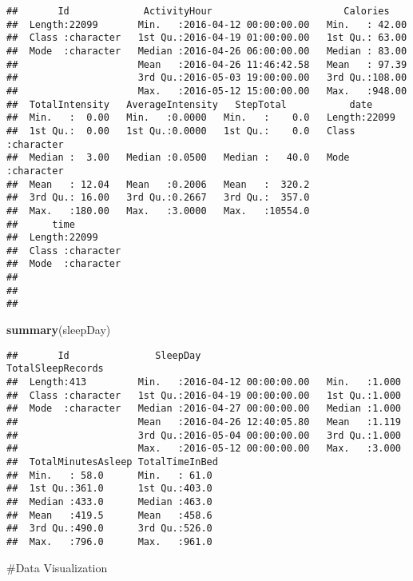 \documentclass[
]{article}
\newenvironment{Shaded}{\begin{snugshade}}{\end{snugshade}}
\newcommand{\FunctionTok}[1]{\textcolor[rgb]{0.13,0.29,0.53}{\textbf{#1}}}
\newcommand{\NormalTok}[1]{#1}
\begin{document}
\begin{verbatim}
##       Id             ActivityHour                       Calories     
##  Length:22099       Min.   :2016-04-12 00:00:00.00   Min.   : 42.00  
##  Class :character   1st Qu.:2016-04-19 01:00:00.00   1st Qu.: 63.00  
##  Mode  :character   Median :2016-04-26 06:00:00.00   Median : 83.00  
##                     Mean   :2016-04-26 11:46:42.58   Mean   : 97.39  
##                     3rd Qu.:2016-05-03 19:00:00.00   3rd Qu.:108.00  
##                     Max.   :2016-05-12 15:00:00.00   Max.   :948.00  
##  TotalIntensity   AverageIntensity   StepTotal           date          
##  Min.   :  0.00   Min.   :0.0000   Min.   :    0.0   Length:22099      
##  1st Qu.:  0.00   1st Qu.:0.0000   1st Qu.:    0.0   Class :character  
##  Median :  3.00   Median :0.0500   Median :   40.0   Mode  :character  
##  Mean   : 12.04   Mean   :0.2006   Mean   :  320.2                     
##  3rd Qu.: 16.00   3rd Qu.:0.2667   3rd Qu.:  357.0                     
##  Max.   :180.00   Max.   :3.0000   Max.   :10554.0                     
##      time          
##  Length:22099      
##  Class :character  
##  Mode  :character  
##                    
##                    
## 
\end{verbatim}

\begin{Shaded}
\begin{Highlighting}[]
\FunctionTok{summary}\NormalTok{(sleepDay)}
\end{Highlighting}
\end{Shaded}

\begin{verbatim}
##       Id               SleepDay                      TotalSleepRecords
##  Length:413         Min.   :2016-04-12 00:00:00.00   Min.   :1.000    
##  Class :character   1st Qu.:2016-04-19 00:00:00.00   1st Qu.:1.000    
##  Mode  :character   Median :2016-04-27 00:00:00.00   Median :1.000    
##                     Mean   :2016-04-26 12:40:05.80   Mean   :1.119    
##                     3rd Qu.:2016-05-04 00:00:00.00   3rd Qu.:1.000    
##                     Max.   :2016-05-12 00:00:00.00   Max.   :3.000    
##  TotalMinutesAsleep TotalTimeInBed 
##  Min.   : 58.0      Min.   : 61.0  
##  1st Qu.:361.0      1st Qu.:403.0  
##  Median :433.0      Median :463.0  
##  Mean   :419.5      Mean   :458.6  
##  3rd Qu.:490.0      3rd Qu.:526.0  
##  Max.   :796.0      Max.   :961.0
\end{verbatim}

\#Data Visualization
\end{document}
